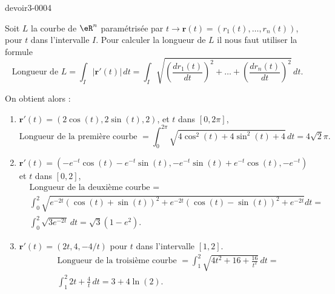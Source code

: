 \begin{corrige}{devoir3-0004}

Soit $L$ la courbe de $\eR^n$ paramétrisée par $t\to \textbf{r}(t)= (r_1(t), \ldots, r_n(t))$, pour $t$ dans l'intervalle $I$. 
Pour calculer la longueur de $L$  il  nous faut utiliser la formule 
\begin{equation}
  \textrm{Longueur de } L = \int_{I} |\mathbf{r'}(t)|\, dt= \int_{I} \sqrt{\left(\frac{d r_1(t)}{dt}\right)^2+\ldots +\left(\frac{d r_n(t)}{dt}\right)^2}\, dt.
\end{equation}

On obtient alors :  
\begin{enumerate}
\item $\mathbf{r'}(t)= (2\cos(t), 2\sin(t), 2)$, et $t$ dans $[0,2\pi]$,
  \begin{equation}
   \textrm{Longueur de la première courbe }= \int_0^{2\pi}  \sqrt{4\cos^2(t)+4\sin^2(t) + 4}\, dt= 4\sqrt{2}\pi.  
  \end{equation}
\item $\mathbf{r'}(t)= (-e^{-t}\cos(t)-e^{-t}\sin(t), -e^{-t}\sin(t)+e^{-t}\cos(t), -e^{-t})$ et  $t$ dans $[0,2]$, 
  \begin{equation}
    \begin{aligned}
      &\textrm{Longueur de la deuxième courbe }=\\
& \int_0^{2}  \sqrt{e^{-2t}(\cos(t)+\sin(t))^2+e^{-2t}(\cos(t)-\sin(t))^2+ e^{-2t}} dt= \\
    &\int_0^{2}  \sqrt{3e^{-2t}}\, dt= \sqrt{3}(1-e^{2}).
    \end{aligned}
  \end{equation}
\item $\mathbf{r'}(t)= (2t, 4, -4/t)$ pour $t$ dans l'intervalle $[1,2]$.  
 \begin{equation}
    \begin{aligned}
     & \textrm{Longueur de la troisième courbe }= \int_1^{2}  \sqrt{4t^2+16+ \frac{16}{t^2}}\, dt= \\
    &\int_1^{2}  2t+\frac{4}{t}\, dt= 3+4\ln(2).
    \end{aligned}
  \end{equation}
\end{enumerate}
\end{corrige}
